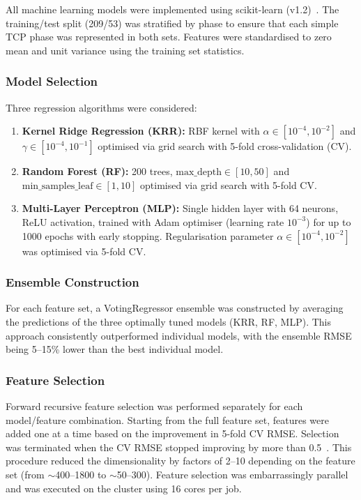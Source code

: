 All machine learning models were implemented using scikit-learn (v1.2)~\cite{sklearn}. The training/test split (209/53) was stratified by phase to ensure that each simple TCP phase was represented in both sets. Features were standardised to zero mean and unit variance using the training set statistics.

\subsubsection*{Model Selection}

Three regression algorithms were considered:

\begin{enumerate}
  \item \textbf{Kernel Ridge Regression (KRR):} RBF kernel with $\alpha \in [10^{-4}, 10^{-2}]$ and $\gamma \in [10^{-4}, 10^{-1}]$ optimised via grid search with 5-fold cross-validation (CV).
  \item \textbf{Random Forest (RF):} 200 trees, $\text{max\_depth} \in [10, 50]$ and $\text{min\_samples\_leaf} \in [1, 10]$ optimised via grid search with 5-fold CV.
  \item \textbf{Multi-Layer Perceptron (MLP):} Single hidden layer with 64 neurons, ReLU activation, trained with Adam optimiser (learning rate $10^{-3}$) for up to 1000 epochs with early stopping. Regularisation parameter $\alpha \in [10^{-4}, 10^{-2}]$ was optimised via 5-fold CV.
\end{enumerate}

\subsubsection*{Ensemble Construction}

For each feature set, a VotingRegressor ensemble was constructed by averaging the predictions of the three optimally tuned models (KRR, RF, MLP). This approach consistently outperformed individual models, with the ensemble RMSE being 5--15\% lower than the best individual model.

\subsubsection*{Feature Selection}

Forward recursive feature selection was performed separately for each model/feature combination. Starting from the full feature set, features were added one at a time based on the improvement in 5-fold CV RMSE. Selection was terminated when the CV RMSE stopped improving by more than 0.5~\meVat. This procedure reduced the dimensionality by factors of 2--10 depending on the feature set (from $\sim$400--1800 to $\sim$50--300). Feature selection was embarrassingly parallel and was executed on the cluster using 16 cores per job.

